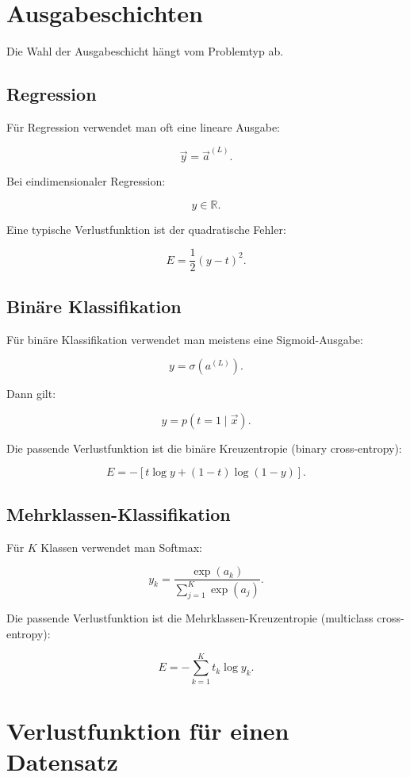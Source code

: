 \section{Ausgabeschichten}

Die Wahl der Ausgabeschicht hängt vom Problemtyp ab.

\subsection{Regression}

Für Regression verwendet man oft eine lineare Ausgabe:

\[
    \vec{y}
    =
    \vec{a}^{(L)}.
\]

Bei eindimensionaler Regression:

\[
    y \in \mathbb{R}.
\]

Eine typische Verlustfunktion ist der quadratische Fehler:

\[
    E
    =
    \frac{1}{2}
    (y-t)^2.
\]

\subsection{Binäre Klassifikation}

Für binäre Klassifikation verwendet man meistens eine Sigmoid-Ausgabe:

\[
    y
    =
    \sigma(a^{(L)}).
\]

Dann gilt:

\[
    y
    =
    p(t=1\mid\vec{x}).
\]

Die passende Verlustfunktion ist die binäre Kreuzentropie (binary cross-entropy):

\[
    E
    =
    -\left[
        t\log y
        +
        (1-t)\log(1-y)
    \right].
\]

\subsection{Mehrklassen-Klassifikation}

Für \(K\) Klassen verwendet man Softmax:

\[
    y_k
    =
    \frac{\exp(a_k)}
    {\sum_{j=1}^{K}\exp(a_j)}.
\]

Die passende Verlustfunktion ist die Mehrklassen-Kreuzentropie (multiclass cross-entropy):

\[
    E
    =
    -\sum_{k=1}^{K}
    t_k\log y_k.
\]

\section{Verlustfunktion für einen Datensatz}

